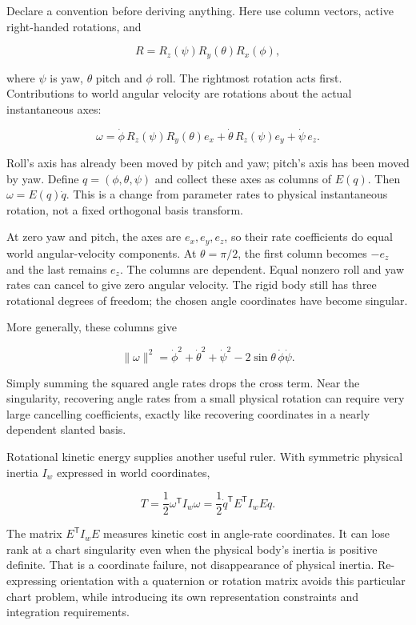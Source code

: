 Declare a convention before deriving anything. Here use column vectors, active right-handed rotations, and

\[
R=R_z(\psi)R_y(\theta)R_x(\phi),
\]

where \(\psi\) is yaw, \(\theta\) pitch and \(\phi\) roll. The rightmost rotation acts first. Contributions to world angular velocity are rotations about the actual instantaneous axes:

\[
\omega=
\dot\phi\,R_z(\psi)R_y(\theta)e_x
+\dot\theta\,R_z(\psi)e_y
+\dot\psi\,e_z.
\]

Roll's axis has already been moved by pitch and yaw; pitch's axis has been moved by yaw. Define \(q=(\phi,\theta,\psi)\) and collect these axes as columns of \(E(q)\). Then \(\omega=E(q)\dot q\). This is a change from parameter rates to physical instantaneous rotation, not a fixed orthogonal basis transform.

At zero yaw and pitch, the axes are \(e_x,e_y,e_z\), so their rate coefficients do equal world angular-velocity components. At \(\theta=\pi/2\), the first column becomes \(-e_z\) and the last remains \(e_z\). The columns are dependent. Equal nonzero roll and yaw rates can cancel to give zero angular velocity. The rigid body still has three rotational degrees of freedom; the chosen angle coordinates have become singular.

More generally, these columns give

\[
\|\omega\|^2=
\dot\phi^2+\dot\theta^2+\dot\psi^2
-2\sin\theta\,\dot\phi\dot\psi.
\]

Simply summing the squared angle rates drops the cross term. Near the singularity, recovering angle rates from a small physical rotation can require very large cancelling coefficients, exactly like recovering coordinates in a nearly dependent slanted basis.

Rotational kinetic energy supplies another useful ruler. With symmetric physical inertia \(I_w\) expressed in world coordinates,

\[
T=\frac12\omega^{\mathsf T}I_w\omega
=\frac12\dot q^{\mathsf T}E^{\mathsf T}I_wE\dot q.
\]

The matrix \(E^{\mathsf T}I_wE\) measures kinetic cost in angle-rate coordinates. It can lose rank at a chart singularity even when the physical body's inertia is positive definite. That is a coordinate failure, not disappearance of physical inertia. Re-expressing orientation with a quaternion or rotation matrix avoids this particular chart problem, while introducing its own representation constraints and integration requirements.

